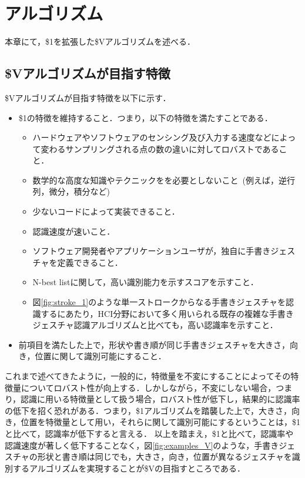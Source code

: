 \chapter{\SysName アルゴリズム}
本章にて，\$1を拡張した\$Vアルゴリズムを述べる．

\section{\$Vアルゴリズムが目指す特徴}
\$Vアルゴリズムが目指す特徴を以下に示す．
\begin{itemize}
\item \$1の特徴を維持すること．つまり，以下の特徴を満たすことである．
\begin{itemize}
\item ハードウェアやソフトウェアのセンシング及び入力する速度などによって変わるサンプリングされる点の数の違いに対してロバストであること．
\item 数学的な高度な知識やテクニックをを必要としないこと~(例えば，逆行列，微分，積分など)
\item 少ないコードによって実装できること．
\item 認識速度が速いこと．
\item ソフトウェア開発者やアプリケーションユーザが，独自に手書きジェスチャを定義できること．
\item N-best listに関して，高い識別能力を示すスコアを示すこと．
\item 図\ref{fig:stroke_1}のような単一ストロークからなる手書きジェスチャを認識するにあたり，HCI分野において多く用いられる既存の複雑な手書きジェスチャ認識アルゴリズムと比べても，高い認識率を示すこと．
\end{itemize}
\item 前項目を満たした上で，形状や書き順が同じ手書きジェスチャを大きさ，向き，位置に関して識別可能にすること．
\end{itemize}

これまで述べてきたように，一般的に，特徴量を不変にすることによってその特徴量についてロバスト性が向上する．しかしながら，不変にしない場合，つまり，認識に用いる特徴量として扱う場合，ロバスト性が低下し，結果的に認識率の低下を招く恐れがある．つまり，\$1アルゴリズムを踏襲した上で，大きさ，向き，位置を特徴量として用い，それらに関して識別可能にするということは，\$1と比べて，認識率が低下すると言える．
以上を踏まえ，\$1と比べて，認識率や認識速度が著しく低下することなく，図\ref{fig:examples_V}のような，手書きジェスチャの形状と書き順は同じでも，大きさ，向き，位置が異なるジェスチャを識別するアルゴリズムを実現することが\$Vの目指すところである．

